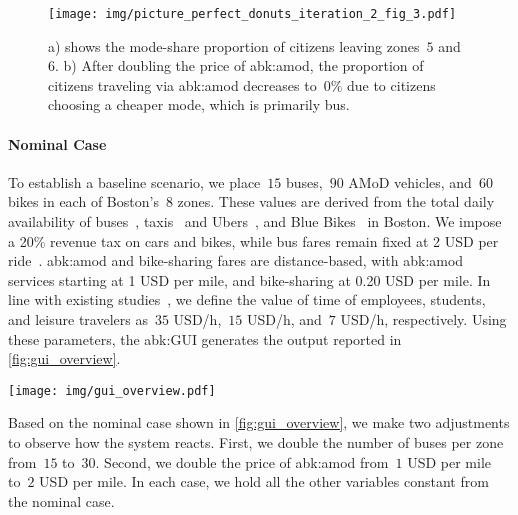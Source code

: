 \begin{figure}[h]
    \centering
    \texttt{[image: img/picture\_perfect\_donuts\_iteration\_2\_fig\_3.pdf]}
    \caption{a) shows the mode-share proportion of citizens leaving zones~$5$ and~$6$. b) After doubling the price of \gls{abk:amod}, the proportion of citizens traveling via \gls{abk:amod} decreases to~$0\%$ due to citizens choosing a cheaper mode, which is primarily bus.}
    \label{fig:double_amod_price}
\end{figure}

\paragraph*{Nominal Case}
To establish a baseline scenario, we place~$15$ buses,~$90$ AMoD vehicles, and~$60$ bikes in each of Boston's~$8$ zones. 
These values are derived from the total daily availability of buses~\cite{num_buses}, taxis~\cite{num_taxis} and Ubers~\cite{num_ubers}, and Blue Bikes~\cite{num_bikes} in Boston. 
We impose a 20\% revenue tax on cars and bikes, while bus fares remain fixed at 2 USD per ride~\cite{busfares}.
\gls{abk:amod} and bike-sharing fares are distance-based, with \gls{abk:amod} services starting at 1 USD per mile, and bike-sharing at 0.20 USD per mile.
%
In line with existing studies~\cite{lanzetti2023interplay}, we define the value of time of employees, students, and leisure travelers as~$35$ USD/h,~$15$ USD/h, and~$7$ USD/h, respectively. 
%
Using these parameters, the \gls{abk:GUI} generates the output reported in \cref{fig:gui_overview}.
%
\begin{figure*}[t]
    \texttt{[image: img/gui\_overview.pdf]}
    \caption{Overview of the \gls{abk:GUI}. In the leftmost column is the drop down menu for city selection, the buttons to run and re-run the simulation, an interaction menu to set parameters, and a table enumerating the zones in the city. In the center column, the user is presented with graphs showing performance metrics across simulation iterations. In the rightmost column, a ``System Overview" visualizing the proportion of all citizens \textit{leaving} zone~$i$ traveling by mode~$m$. Finally, a map allows the user to locate the studied zones geographically.}
    \label{fig:gui_overview}
\end{figure*}
%
Based on the nominal case shown in \cref{fig:gui_overview}, we make two adjustments to observe how the system reacts. 
First, we double the number of buses per zone from~$15$ to~$30$. 
Second, we double the price of \gls{abk:amod} from~$1$ USD per mile to~$2$ USD per mile. In each case, we hold all the other variables constant from the nominal case.

